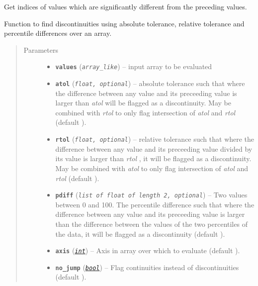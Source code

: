 \documentclass[letterpaper,10pt,english]{sphinxhowto}
\begin{document}

\begin{fulllineitems}
\label{swtools_doc:swtools.where_diff}
Get indices of values which are significantly different from the
preceding values.

Function to find discontinuities using absolute tolerance, relative
tolerance and percentile differences over an array.
\begin{quote}\begin{description}
\item[{Parameters}] \leavevmode\begin{itemize}
\item {} 
\textbf{\texttt{values}} (\emph{\texttt{array\_like}}) -- input array to be evaluated

\item {} 
\textbf{\texttt{atol}} (\emph{\texttt{float, optional}}) -- absolute tolerance such that where the difference between any value
and its preceeding value is larger than \emph{atol} will be flagged as a
discontinuity. May be combined with \emph{rtol} to only flag
intersection of \emph{atol} and \emph{rtol} (default ).

\item {} 
\textbf{\texttt{rtol}} (\emph{\texttt{float, optional}}) -- relative tolerance such that where the difference between any value
and its preceeding value divided by its value is larger than \emph{rtol}
, it will be flagged as a discontinuity. May be combined with
\emph{atol} to only flag intersection of \emph{atol} and  \emph{rtol}
(default ).

\item {} 
\textbf{\texttt{pdiff}} (\emph{\texttt{list of float of length 2, optional}}) -- Two values between 0 and 100. The percentile difference such that
where the difference between any value and its preceeding value is
larger than the difference between the values of the two
percentiles of the data, it will be flagged as a discontinuity
(default \code{{[}75,25{]}}).

\item {} 
\textbf{\texttt{axis}} (\href{https://docs.python.org/library/functions.html\#int}{\emph{\texttt{int}}}) -- Axis in array over which to evaluate (default ).

\item {} 
\textbf{\texttt{no\_jump}} (\href{https://docs.python.org/library/functions.html\#bool}{\emph{\texttt{bool}}}) -- Flag continuities instead of discontinuities (default ).


\end{itemize}
\end{description}
\end{quote}
\end{fulllineitems}
\end{document}
